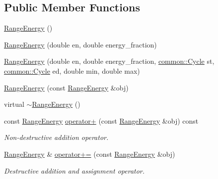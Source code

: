 \subsection*{\-Public \-Member \-Functions}
\begin{DoxyCompactItemize}
\item 
\hyperlink{structcryomesh_1_1manipulators_1_1ClusterAnalysisData_1_1RangeEnergy_a2b748fd0dc43023c69f702c41553aceb}{\-Range\-Energy} ()
\item 
\hyperlink{structcryomesh_1_1manipulators_1_1ClusterAnalysisData_1_1RangeEnergy_abf3ff2eb9a39171461d1137eda38f8d3}{\-Range\-Energy} (double en, double energy\-\_\-fraction)
\item 
\hyperlink{structcryomesh_1_1manipulators_1_1ClusterAnalysisData_1_1RangeEnergy_aeea4ce3ee9e2b1fdbe7e11bca5054b59}{\-Range\-Energy} (double en, double energy\-\_\-fraction, \hyperlink{classcryomesh_1_1common_1_1Cycle}{common\-::\-Cycle} st, \hyperlink{classcryomesh_1_1common_1_1Cycle}{common\-::\-Cycle} ed, double min, double max)
\item 
\hyperlink{structcryomesh_1_1manipulators_1_1ClusterAnalysisData_1_1RangeEnergy_afda1e98ceb489ddd22f557fbda270fed}{\-Range\-Energy} (const \hyperlink{structcryomesh_1_1manipulators_1_1ClusterAnalysisData_1_1RangeEnergy}{\-Range\-Energy} \&obj)
\item 
virtual \hyperlink{structcryomesh_1_1manipulators_1_1ClusterAnalysisData_1_1RangeEnergy_aa586818fb71f316d9d031cc36eec2556}{$\sim$\-Range\-Energy} ()
\item 
const \hyperlink{structcryomesh_1_1manipulators_1_1ClusterAnalysisData_1_1RangeEnergy}{\-Range\-Energy} \hyperlink{structcryomesh_1_1manipulators_1_1ClusterAnalysisData_1_1RangeEnergy_a3e872ded9405bd8e1d994d8ebbd11ef3}{operator+} (const \hyperlink{structcryomesh_1_1manipulators_1_1ClusterAnalysisData_1_1RangeEnergy}{\-Range\-Energy} \&obj) const 
\begin{DoxyCompactList}\small\item\em \-Non-\/destructive addition operator. \end{DoxyCompactList}\item 
\hyperlink{structcryomesh_1_1manipulators_1_1ClusterAnalysisData_1_1RangeEnergy}{\-Range\-Energy} \& \hyperlink{structcryomesh_1_1manipulators_1_1ClusterAnalysisData_1_1RangeEnergy_a63e6c674d7f7e89a90f88d5462279f1e}{operator+=} (const \hyperlink{structcryomesh_1_1manipulators_1_1ClusterAnalysisData_1_1RangeEnergy}{\-Range\-Energy} \&obj)
\begin{DoxyCompactList}\small\item\em \-Destructive addition and assignment operator. \end{DoxyCompactList}\item 

\end{DoxyCompactItemize}
